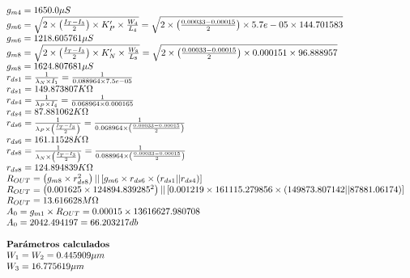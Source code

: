 \begin{equation}
\begin{array}{l l}
		g_{m4} =  1650.0  \mu S \\
		g_{m6} = \sqrt{2 \times \left( \frac{I_{T} - I_{3}}{2} \right) \times K'_{P} \times \frac{W_4}{L_4}} = \sqrt{2 \times \left( \frac{ 0.00033  -  0.00015 }{2} \right) \times  5.7e-05  \times  144.701583 } \\
		g_{m6} =  1218.605761  \mu S \\
		g_{m8} = \sqrt{2 \times \left( \frac{I_{T} - I_{3}}{2} \right) \times K'_{N} \times \frac{W_8}{L_8}} = \sqrt{2 \times \left( \frac{ 0.00033  -  0.00015 }{2} \right) \times  0.000151  \times  96.888957 } \\
		g_{m8} =  1624.807681  \mu S \\
		r_{ds1} = \frac{1}{\lambda_{N} \times I_{1}} = \frac{1}{ 0.088964  \times  7.5e-05 } \\
		r_{ds1} =  149.873807  K \Omega \\
		r_{ds4} = \frac{1}{\lambda_{P} \times I_{4}} = \frac{1}{ 0.068964  \times  0.000165 } \\
		r_{ds4} =  87.881062  K \Omega \\
		r_{ds6} = \frac{1}{\lambda_{P} \times \left( \frac{I_{T} - I_{3}}{2} \right)} = \frac{1}{ 0.068964  \times \left( \frac{ 0.00033  -  0.00015 }{2} \right)} \\
		r_{ds6} =  161.11528  K \Omega \\
		r_{ds8} = \frac{1}{\lambda_{N} \times \left( \frac{I_{T} - I_{3}}{2} \right)} = \frac{1}{ 0.088964  \times \left( \frac{ 0.00033  -  0.00015 }{2} \right)} \\
		r_{ds8} =  124.894839  K \Omega \\
		R_{OUT} = \left( g_{m8} \times r_{ds8}^{2} \right) || \left[ g_{m6} \times r_{ds6} \times \left( r_{ds1} || r_{ds4} \right) \right] \\
		R_{OUT} = \left(  0.001625  \times  124894.839285 ^{2} \right) || \left[  0.001219  \times  161115.279856  \times \left(  149873.807142  ||  87881.06174  \right) \right] \\
		R_{OUT} =  13.616628  M \Omega \\
		A_{0} = g_{m1} \times R_{OUT} =  0.00015  \times  13616627.980708  \\
		A_{0} =  2042.494197  =  66.203217  db \\
		\\
		\textbf{Parámetros calculados} \\
		W_{1} = W_{2} =  0.445909  \mu m \\
		W_{3} =  16.775619  \mu m \\

\end{array}
\end{equation}
